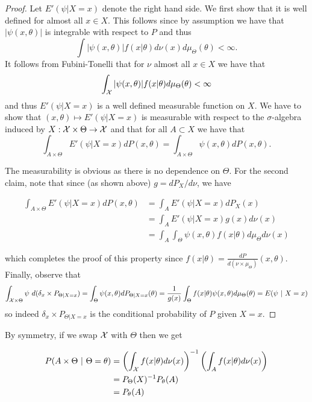 \documentclass[twoside, a4paper, 10pt]{amsart}
\begin{document}
\begin{proof} Let $E'(\psi |X=x)$ denote the right hand side. We first show that it is well defined for almost all $x \in X$. This follows since by assumption we have that $|\psi(x,\theta)|$ is integrable with respect to $P$ and thus $$\int |\psi(x,\theta)| f(x|\theta) d\nu(x) d\mu_{\Theta} (\theta) < \infty.$$ It follows from Fubini-Tonelli that for $\nu$ almost all $x \in X$ we have that $$\int_{\mathcal{X}} |\psi(x,\theta)| f(x|\theta) d\mu_{\Theta}(\theta) < \infty$$ and thus $E'(\psi | X=x)$ is a well defined measurable function on $X$. We have to show that $(x, \theta) \mapsto E'(\psi |X=x)$ is measurable with respect to the $\sigma$-algebra induced by $X: \mathcal{X} \times \Theta \to \mathcal{X}$ and that for all $A \subset X$ we have that $$\int_{A \times \Theta} E'(\psi |X=x) dP(x, \theta) = \int_{A \times \Theta} \psi(x,\theta) dP(x, \theta).$$

The measurability is obvious as there is no dependence on $\Theta$. For the second claim, note that since (as shown above) $g = dP_X/d\nu$, we have 

\begin{align*} \int_{A \times \Theta} E'(\psi |X=x) dP(x, \theta) &= \int_{A} E'(\psi |X=x) dP_X(x) \\
&=\int_{A} E'(\psi |X=x) g(x) d\nu(x) \\ 
&= \int_{A} \int_{\Theta} \psi(x, \theta) f(x|\theta) d\mu_{\Theta} d\nu(x)\end{align*}

which completes the proof of this property since $f(x|\theta) = \frac{dP}{d(\nu \times \mu_{\Theta})}(x,\theta) $. Finally, observe that $$\int _{\mathcal{X} \times \Theta} \psi ~d(\delta_x \times P_{\Theta|X=x}) = \int_{\Theta} \psi(x,\theta) dP_{\Theta |X=x}(\theta) = \frac{1}{g(x)} \int_{\Theta} f(x|\theta) \psi(x,\theta) d\mu_{\Theta}(\theta) = E(\psi ~|~ X=x) $$ so indeed $\delta_x \times P_{\Theta|X=x}$ is the conditional probability of $P$ given $X=x$. \end{proof}

By symmetry, if we swap $\mathcal{X}$ with $\Theta$ then we get 

\begin{align*} P(A \times \Theta ~|~ \Theta = \theta) &= \left(\int_{\mathcal{X}} f(x|\theta) d\nu(x) \right)^{-1} \left(\int_{A} f(x|\theta) d\nu(x) \right) \\
&= P_{\Theta}(X)^{-1} P_{\theta}(A) \\
&= P_{\theta}(A) \end{align*}
\end{document}
